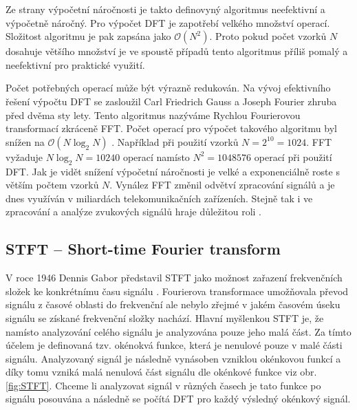   Ze strany výpočetní náročnosti je takto definovyný algoritmus neefektivní a výpočetně náročný.
  Pro výpočet \acs{DFT} je zapotřebí velkého množství operací. Složitost algoritmu je pak zapsána jako $\mathcal{O}(N^2)$.
  Proto pokud počet vzorků $N$ dosahuje většího množství je ve spoustě případů tento algoritmus příliš pomalý a neefektivní pro praktické využití.

  Počet potřebných operací může být výrazně redukován. 
  Na vývoj efektivního řešení výpočtu \acs{DFT} se zasloužil Carl Friedrich Gauss a Joseph Fourier zhruba před dvěma sty lety. Tento algoritmus nazýváme Rychlou Fourierovou transformací zkráceně FFT.
  Počet operací pro výpočet takového algoritmu byl snížen na $\mathcal{O}(N \log_2 N)$ \cite{fundamental_of_music_processing}.
  Například při použití vzorků $N = 2^{10} = 1024$. \acs{FFT} vyžaduje $N\log_2N = 10240 $ operací namísto $N^2 = 1048576$ operací při použití \acs{DFT}. Jak je vidět snížení výpočetní náročnosti je velké a exponenciálně roste s větším počtem vzorků $N$.
  Vynález \acs{FFT} změnil odvětví zpracování signálů a je dnes využíván v miliardách telekomunikačních zařízeních. Stejně tak i ve zpracování a analýze zvukových signálů hraje důležitou roli \cite{fundamental_of_music_processing}.

  
  \subsection{STFT -- Short-time Fourier transform} \label{sec:STFT}

  V roce 1946 Dennis Gabor představil \acs{STFT} jako možnost zařazení frekvenčních složek ke konkrétnímu času signálu \cite{strichartz2003guide}.
  Fourierova transformace umožňovala převod signálu z časové oblasti do frekvenční ale nebylo zřejmé v jakém časovém úseku signálu se získané frekvenční složky nachází.
  Hlavní myšlenkou \acs{STFT} je, že namísto analyzování celého signálu je analyzována pouze jeho malá část.
  Za tímto účelem je definovaná tzv. okénokvá funkce, která je nenulové pouze v malé části signálu.
  Analyzovaný signál je následně vynásoben vzniklou okénkovou funkcí a díky tomu vzniká malá nenulová část signálu dle okénkové funkce viz obr. \ref{fig:STFT}.
  Chceme li analyzovat signál v různých časech je tato funkce po signálu posouvána a následně se počítá \acs{DFT} pro každý výsledný okénkový signál.

